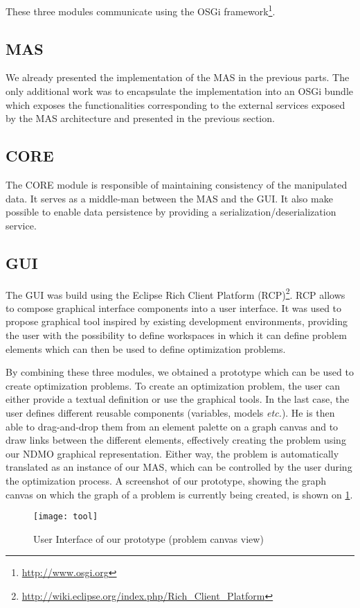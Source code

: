 These three modules communicate using the OSGi framework\footnote{\url{http://www.osgi.org}}.

\subsection{MAS}

We already presented the implementation of the MAS in the previous parts. The only additional work was to encapsulate the implementation into an OSGi bundle which exposes the functionalities corresponding to the external services exposed by the MAS architecture and presented in the previous section.

\subsection{CORE}

The CORE module is responsible of maintaining consistency of the manipulated data. It serves as a middle-man between the MAS and the GUI. It also make possible to enable data persistence by providing a serialization/deserialization service.

\subsection{GUI}

The GUI was build using the Eclipse Rich Client Platform (RCP)\footnote{\url{http://wiki.eclipse.org/index.php/Rich_Client_Platform}}. RCP allows to compose graphical interface components into a user interface. It was used to propose graphical tool inspired by existing development environments, providing the user with the possibility to define workspaces in which it can define problem elements which can then be used to define optimization problems.

\bigskip

By combining these three modules, we obtained a prototype which can be used to create optimization problems. To create an optimization problem, the user can either provide a textual definition or use the graphical tools. In the last case, the user defines different reusable components (variables, models \emph{etc.}). He is then able to drag-and-drop them from an element palette on a graph canvas and to draw links between the different elements, effectively creating the problem using our NDMO graphical representation. Either way, the problem is automatically translated as an instance of our MAS, which can be controlled by the user during the optimization process. A screenshot of our prototype, showing the graph canvas on which the graph of a problem is currently being created, is shown on \figurename{} \ref{tool}.

\begin{figure}
\texttt{[image: tool]}
\caption{User Interface of our prototype (problem canvas view)}\label{tool}
\end{figure}